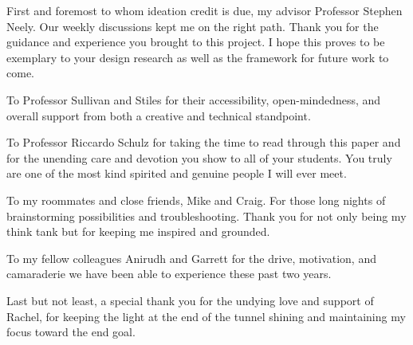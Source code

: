 
\setlength{\parskip}{1em}
\setlength{\parindent}{0em}

\noindent
First and foremost to whom ideation credit is due, my advisor Professor Stephen Neely. Our weekly discussions kept me on the right path. Thank you for the guidance and experience you brought to this project. I hope this proves to be exemplary to your design research as well as the framework for future work to come.

To Professor Sullivan and Stiles for their accessibility, open-mindedness, and overall support from both a creative and technical standpoint.

To Professor Riccardo Schulz for taking the time to read through this paper and for the unending care and devotion you show to all of your students. You truly are one of the most kind spirited and genuine people I will ever meet.

To my roommates and close friends, Mike and Craig. For those long nights of brainstorming possibilities and troubleshooting. Thank you for not only being my think tank but for keeping me inspired and grounded.

To my fellow colleagues Anirudh and Garrett for the drive, motivation, and camaraderie we have been able to experience these past two years.

Last but not least, a special thank you for the undying love and support of Rachel, for keeping the light at the end of the tunnel shining and maintaining my focus toward the end goal.